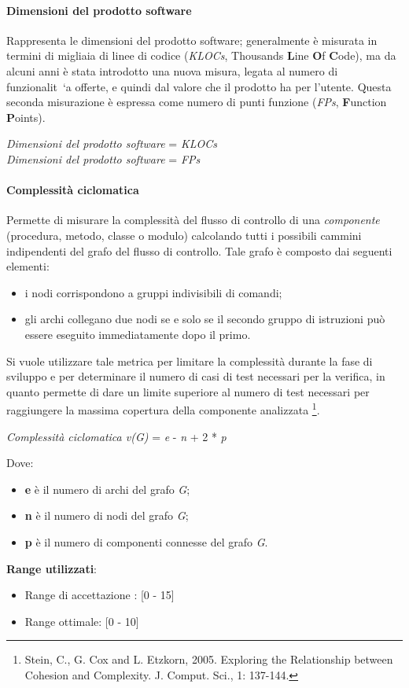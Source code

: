 \paragraph{Dimensioni del prodotto software}
Rappresenta le dimensioni del prodotto software; generalmente \`e misurata in termini di migliaia di linee di codice (\textit{KLOCs}, Thousands \textbf{L}ine \textbf{O}f \textbf{C}ode), ma da alcuni anni \`e stata introdotto una nuova misura, legata al numero di funzionalit\ `a offerte, e quindi dal valore che il prodotto ha per l'utente. Questa seconda misurazione \`e espressa come numero di punti funzione (\textit{FPs}, \textbf{F}unction \textbf{P}oints). \\
\begin{center}
	\textit{Dimensioni del prodotto software} = \textit{KLOCs} \\
	\textit{Dimensioni del prodotto software} = \textit{FPs} 
\end{center}

\paragraph{Complessit\`a ciclomatica}
Permette di misurare la complessit\`a del flusso di controllo di una \textit{componente} (procedura, metodo, classe o modulo) calcolando tutti i possibili cammini indipendenti del grafo del flusso di controllo. Tale grafo \`e composto dai seguenti elementi:
\begin{itemize}
	\item i nodi corrispondono a gruppi indivisibili di comandi;
	\item gli archi collegano due nodi se e solo se il secondo gruppo di istruzioni pu\`o essere eseguito immediatamente dopo il primo.
\end{itemize}
Si vuole utilizzare tale metrica per limitare la complessit\`a durante la fase di sviluppo e per determinare il numero di casi di test necessari per la verifica, in quanto permette di dare un limite superiore al numero di test necessari per raggiungere la massima copertura della componente analizzata \footnote{Stein, C., G. Cox and L. Etzkorn, 2005. Exploring the Relationship between Cohesion and Complexity. J. Comput. Sci., 1: 137-144.}.
\begin{center}
	\textit{Complessit\`a ciclomatica v(G)} = \textit{e} - \textit{n} + 2 * \textit{p}
\end{center}
Dove:
\begin{itemize}
	\item \textbf{e} \`e il numero di archi del grafo \textit{G};
	\item \textbf{n} \`e il numero di nodi del grafo \textit{G};
	\item \textbf{p} \`e il numero di componenti connesse del grafo \textit{G}.
\end{itemize}
\textbf{Range utilizzati}:
\begin{itemize}
	\item Range di accettazione : [0 - 15]
	\item Range ottimale: [0 - 10]
\end{itemize}

